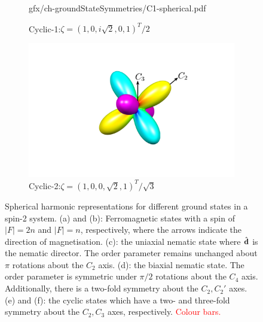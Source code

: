 \begin{figure}
\begin{subfigure}{0.49\textwidth}
        {gfx/ch-groundStateSymmetries/C1-spherical.pdf}
        \caption{\label{subfig: C-1-spherical}
        Cyclic-1:\@ \(\zeta={(1, 0, i\sqrt{2}, 0, 1)}^T/2\)}
    \end{subfigure}
    \begin{subfigure}{0.49\textwidth}
        \includegraphics[width=\textwidth]
        {gfx/ch-groundStateSymmetries/C2-spherical.pdf}
        \caption{\label{subfig: C-2-spherical}
        Cyclic-2:\@ \(\zeta={(1, 0, 0, \sqrt{2}, 1)}^T/\sqrt{3}\)}
    \end{subfigure}
    \caption{\label{fig: spin-2-spherical-harmonics}Spherical harmonic
    representations for different ground states in a spin-2 system.
    (a) and (b): Ferromagnetic states with a spin of \(|F|=2n\) and \(|F|=n\),
    respectively, where the arrows indicate the direction of magnetisation.
    (c): the uniaxial nematic state where \(\hat{\vb{d}}\) is the nematic
    director. The order parameter remains unchanged about \(\pi \) rotations
    about the \(C_2\) axis.
    (d): the biaxial nematic state. The order parameter is symmetric under
    \(\pi/2\) rotations about the \(C_4\) axis.
    Additionally, there is a two-fold symmetry about the \(C_2, C_2'\) axes.
    (e) and (f): the cyclic states which have a two- and three-fold symmetry
    about the \(C_2, C_3\) axes, respectively.
    \textcolor{red}{Colour bars.}}
\end{figure}

